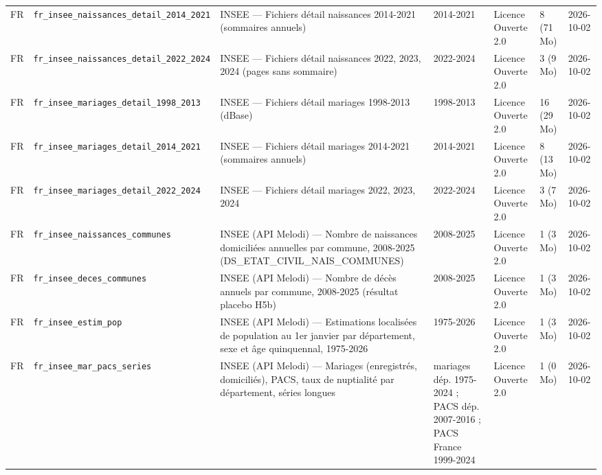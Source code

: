 \begin{longtable}{lp{2.2cm}p{3.9cm}p{2.1cm}p{1.9cm}p{1.4cm}p{1.6cm}}
FR & \texttt{fr\_\allowbreak{}insee\_\allowbreak{}naissances\_\allowbreak{}detail\_\allowbreak{}2014\_\allowbreak{}2021} & INSEE — Fichiers détail naissances 2014-2021 (sommaires annuels) & 2014-2021 & Licence Ouverte 2.0 & 8 (71 Mo) & 2026-10-02 \\
FR & \texttt{fr\_\allowbreak{}insee\_\allowbreak{}naissances\_\allowbreak{}detail\_\allowbreak{}2022\_\allowbreak{}2024} & INSEE — Fichiers détail naissances 2022, 2023, 2024 (pages sans sommaire) & 2022-2024 & Licence Ouverte 2.0 & 3 (9 Mo) & 2026-10-02 \\
FR & \texttt{fr\_\allowbreak{}insee\_\allowbreak{}mariages\_\allowbreak{}detail\_\allowbreak{}1998\_\allowbreak{}2013} & INSEE — Fichiers détail mariages 1998-2013 (dBase) & 1998-2013 & Licence Ouverte 2.0 & 16 (29 Mo) & 2026-10-02 \\
FR & \texttt{fr\_\allowbreak{}insee\_\allowbreak{}mariages\_\allowbreak{}detail\_\allowbreak{}2014\_\allowbreak{}2021} & INSEE — Fichiers détail mariages 2014-2021 (sommaires annuels) & 2014-2021 & Licence Ouverte 2.0 & 8 (13 Mo) & 2026-10-02 \\
FR & \texttt{fr\_\allowbreak{}insee\_\allowbreak{}mariages\_\allowbreak{}detail\_\allowbreak{}2022\_\allowbreak{}2024} & INSEE — Fichiers détail mariages 2022, 2023, 2024 & 2022-2024 & Licence Ouverte 2.0 & 3 (7 Mo) & 2026-10-02 \\
FR & \texttt{fr\_\allowbreak{}insee\_\allowbreak{}naissances\_\allowbreak{}communes} & INSEE (API Melodi) — Nombre de naissances domiciliées annuelles par commune, 2008-2025 (DS\_\allowbreak{}ETAT\_\allowbreak{}CIVIL\_\allowbreak{}NAIS\_\allowbreak{}COMMUNES) & 2008-2025 & Licence Ouverte 2.0 & 1 (3 Mo) & 2026-10-02 \\
FR & \texttt{fr\_\allowbreak{}insee\_\allowbreak{}deces\_\allowbreak{}communes} & INSEE (API Melodi) — Nombre de décès annuels par commune, 2008-2025 (résultat placebo H5b) & 2008-2025 & Licence Ouverte 2.0 & 1 (3 Mo) & 2026-10-02 \\
FR & \texttt{fr\_\allowbreak{}insee\_\allowbreak{}estim\_\allowbreak{}pop} & INSEE (API Melodi) — Estimations localisées de population au 1er janvier par département, sexe et âge quinquennal, 1975-2026 & 1975-2026 & Licence Ouverte 2.0 & 1 (3 Mo) & 2026-10-02 \\
FR & \texttt{fr\_\allowbreak{}insee\_\allowbreak{}mar\_\allowbreak{}pacs\_\allowbreak{}series} & INSEE (API Melodi) — Mariages (enregistrés, domiciliés), PACS, taux de nuptialité par département, séries longues & mariages dép. 1975-2024 ; PACS dép. 2007-2016 ; PACS France 1999-2024 & Licence Ouverte 2.0 & 1 (0 Mo) & 2026-10-02 \\

\end{longtable}
